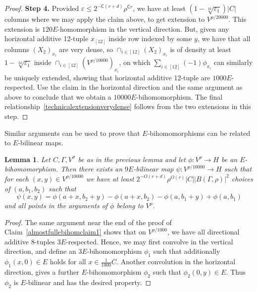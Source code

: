 \documentclass[a4paper,11pt]{article}
\numberwithin{theorem}{section}
\newtheorem{lemma}[theorem]{Lemma}
\theoremstyle{definition}
\newcommand{\blc}{\bm{\mathsf{C}}}
\begin{document}
\begin{proof}
\noindent\textbf{Step 4.} Provided $\varepsilon \leq 2^{-\blc(r + d)}\rho^{\blc r}$, we have at least $(1 - \sqrt[16]{\varepsilon_1})|C|$ columns where we may apply the claim above, to get extension to $V^{\rho/20000}$. This extension is $120E$-homomorphism in the vertical direction. But, given any horizontal additive 12-tuple $x_{[12]}$ inside row indexed by some $y$, we have that all columns $(X_2)_{x_i}$ are very dense, so $\cap_{i \in [12]} (X_2)_{x_i}$ is of density at least $1 - \sqrt[32]{\varepsilon_1}$ inside $\cap_{i \in [12]} (V^{\rho/10000})_{x_i}$, on which $\sum_{i \in [12]} (-1) \phi_{x_i}$ can similarly be uniquely extended, showing that horizontal additive 12-tuple are $1000E$-respected. Use the claim in the horizontal direction and the same argument as above to conclude that we obtain a $10000E$-bihomomorphism. The final relationship~\eqref{technicalextensionverydense} follows from the two extensions in this step.\end{proof}

Similar arguments can be used to prove that $E$-bihomomorphisms can be related to $E$-bilinear maps.


\begin{lemma}\label{ebihomtoebilinearlemma}
    Let $C, \Gamma, V^\sigma$ be as in the previous lemma and let $\phi : V^\rho \to H$ be an $E$-bihomomorphism. Then there exists an $9E$-bilinear map $\psi : V^{\rho/10000} \to H$ such that for each $(x,y) \in V^{\rho/10000}$ we have at least $2^{-O(r + d)}\rho^{O(r)} |C||B(\Gamma, \rho)|^2$ choices of $(a, b_1, b_2)$ such that
    \[\psi(x,y) = \phi(a + x, b_2 + y) - \phi(a + x, b_2) - \phi(a, b_1 + y) + \phi(a, b_1)\]
    and all points in the arguments of $\phi$ belong to $V^{\rho}$.
\end{lemma}

\begin{proof}
    The same argument near the end of the proof of Claim~\ref{almostfullebihomclaim1} shows that on $V^{\rho/1000}$, we have all directional additive 8-tuples $3E$-respected. Hence, we may first convolve in the vertical direction, and define an $3E$-bihomomorphism $\phi_1$ such that additionally $\phi_1(x, 0) \in E$ holds for all $x \in \frac{1}{1000}C$. Another convolution in the horizontal direction, gives a further $E$-bihomomorphism $\phi_2$ such that $\phi_2(0, y) \in E$. Thus $\phi_2$ is $E$-bilinear and has the desired property.
\end{proof}
\end{document}
